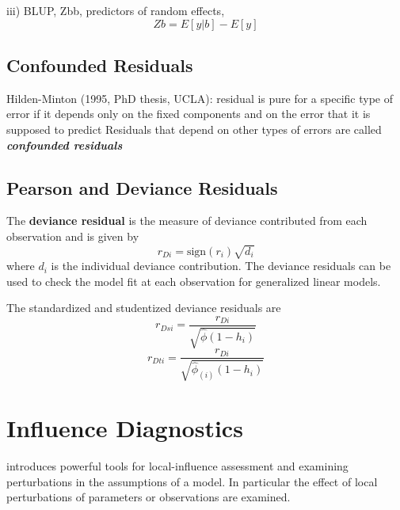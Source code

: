 \documentclass[12pt, a4paper]{report}
\theoremstyle{plain}
\theoremstyle{definition}
\theoremstyle{remark}
\begin{document}
	iii) BLUP, Zbb, predictors of random effects,
	\[ Zb = E[y|b] − E[y]\]
	\section{Confounded Residuals}
	Hilden-Minton (1995, PhD thesis, UCLA): residual is pure for a specific type of error if it depends only on the fixed components and
	on the error that it is supposed to predict	Residuals that depend on other types of errors are called \textit{\textbf{confounded
			residuals}}
	
	
	
	\section{Pearson and Deviance Residuals} 
	
	
	
	
	
	The \textbf{deviance residual} is the measure of deviance contributed from each observation and is given by
	\[r_{Di} = \textrm{sign}( r_{i})
	\sqrt{ d_{i}}\]
	where $d_i$ is the individual deviance contribution.
	The deviance residuals can be used to check the model fit at each observation for generalized linear models. 
	
	
	The standardized and studentized deviance residuals are
	\[
	r_{Dsi} = \frac{r_{Di}}{\sqrt{\hat{ \phi} (1- h_{i})} }\]
	\[r_{Dti} = \frac{r_{Di}}{\sqrt{ \hat{ \phi}_{(i)}
			(1- h_{i})}}\]
	
	
	

	

	


\chapter{Influence Diagnostics}
\citet{cook86} introduces powerful tools for local-influence assessment and examining perturbations in the assumptions of a model. In particular the effect of local perturbations of parameters or observations are examined.
\end{document}
